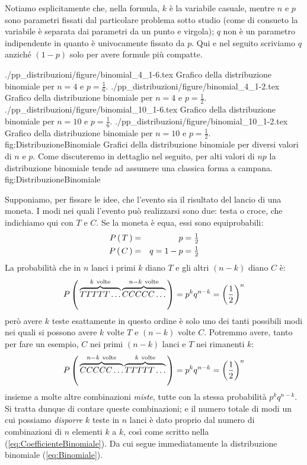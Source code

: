 
\noindent Notiamo esplicitamente che, nella formula, $k$ \`e la
variabile casuale, mentre $n$ e $p$ sono parametri fissati dal
particolare problema sotto studio (come di consueto la variabile
\`e separata dai parametri da un punto e virgola); $q$ non \`e un 
parametro indipendente in quanto \`e univocamente fissato da $p$.
Qui e nel seguito scriviamo $q$ anzich\'e $(1 - p)$ solo per avere
formule pi\`u compatte.

\panelfig
{\twobytwotexfig
{./pp_distribuzioni/figure/binomial_4_1-6.tex}
{Grafico della distribuzione binomiale per \hbox{$n=4$} e
\hbox{$p=\frac{1}{6}$}.}
{./pp_distribuzioni/figure/binomial_4_1-2.tex}
{Grafico della distribuzione binomiale per \hbox{$n=4$} e
\hbox{$p=\frac{1}{2}$}.}
{./pp_distribuzioni/figure/binomial_10_1-6.tex}
{Grafico della distribuzione binomiale per \hbox{$n=10$} e
\hbox{$p=\frac{1}{6}$}.}
{./pp_distribuzioni/figure/binomial_10_1-2.tex}
{Grafico della distribuzione binomiale per \hbox{$n=10$} e
\hbox{$p=\frac{1}{2}$}.}
{fig:DistribuzioneBinomiale}}
{Grafici della distribuzione binomiale per diversi valori di $n$
e $p$. Come discuteremo in dettaglio nel seguito, per alti valori di $np$ la
distribuzione binomiale tende ad assumere una classica forma a campana.}
{fig:DistribuzioneBinomiale}

Supponiamo, per fissare le idee, che l'evento sia il risultato del
lancio di una moneta. I modi nei quali l'evento pu\`o realizzarsi sono due:
testa o croce, che indichiamo qui con $T$ e $C$. Se la moneta \`e
equa, essi sono equiprobabili:
\begin{eqnarray*}
\displaystyle P\left(\, T \, \right) & = & p = {\textstyle \frac{1}{2}}\\
\displaystyle P\left(\, C \, \right) & = & q = 1 - p = {\textstyle \frac{1}{2}}
\end{eqnarray*}
La probabilit\`a che in $n$ lanci i primi $k$ diano $T$ e gli altri $(n - k)$
diano $C$ \`e:
$$
\displaystyle P\left(\, \overbrace{TTTTT\ldots}^{k~{\rm volte}}
\overbrace{CCCCC\ldots}^{n - k~{\rm volte}} \, \right) =
p^k q^{n - k} = \left( \frac{1}{2} \right)^n
$$
per\`o avere $k$ teste esattamente in questo ordine \`e solo uno dei tanti
possibili modi nei quali si possono avere $k$ volte $T$ e $(n-k)$ volte $C$.
Potremmo avere, tanto per fare un esempio, $C$ nei primi $(n - k)$ lanci e
$T$ nei rimanenti $k$:
$$
\displaystyle P\left(\, \overbrace{CCCCC\ldots}^{n - k~{\rm volte}}
\overbrace{TTTTT\ldots}^{k~{\rm volte}} \, \right) =
p^k q^{n - k} = \left( \frac{1}{2} \right)^n
$$
insieme a molte altre combinazioni \emph{miste}, tutte con la stessa
probabilit\`a $p^k q^{n - k}$. Si tratta dunque di contare queste combinazioni;
e il numero totale di modi un cui possiamo \emph{disporre} $k$ teste in $n$
lanci \`e dato proprio dal numero di combinazioni di $n$ elementi $k$ a $k$,
cos\`i come scritto nella (\ref{eq:CoefficienteBinomiale}).
Da cui segue immediatamente la distribuzione binomiale (\ref{eq:Binomiale}).

